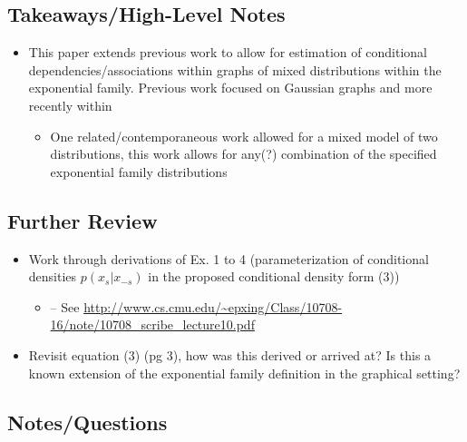 \documentclass[11pt]{article}
\begin{document}
\subsection*{Takeaways/High-Level Notes}
	\begin{itemize}
		\item This paper extends previous work to allow for estimation of conditional dependencies/associations within graphs of mixed distributions within the exponential family. Previous work focused on Gaussian graphs and more recently within 
		\begin{itemize}
			\item One related/contemporaneous work allowed for a mixed model of two distributions, this work allows for any(?) combination of the specified exponential family distributions
        \end{itemize}
	\end{itemize}

\subsection*{Further Review}
	
	\begin{itemize}
		\item Work through derivations of Ex. 1 to 4 (parameterization of conditional densities $p(x_s | x_{-s})$ in the proposed conditional density form (3))
        \begin{itemize}
            \item -- See \url{http://www.cs.cmu.edu/~epxing/Class/10708-16/note/10708_scribe_lecture10.pdf}
        \end{itemize}
        \item Revisit equation (3) (pg 3), how was this derived or arrived at? Is this a known extension of the exponential family definition in the graphical setting? 
	\end{itemize}

\subsection*{Notes/Questions}
	
\end{document}
